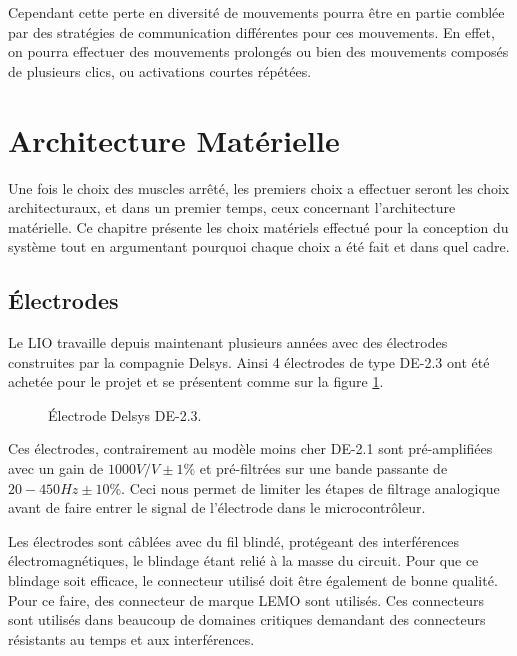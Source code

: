 \documentclass[letterpaper, twoside, 12pt, memoire, creativecommons, hyperref]{thETS}
\begin{document}
Cependant cette perte en diversité de mouvements pourra être en partie comblée par des stratégies de communication différentes pour ces mouvements. En effet, on pourra effectuer des mouvements prolongés ou bien des mouvements composés de plusieurs clics, ou activations courtes répétées. 


\section{Architecture Matérielle}\label{CHarchimat}

Une fois le choix des muscles arrêté, les premiers choix a effectuer seront les choix architecturaux, et dans un premier temps, ceux concernant l'architecture matérielle. Ce chapitre présente les choix matériels effectué pour la conception du système tout en argumentant pourquoi chaque choix a été fait et dans quel cadre.

\subsection{Électrodes}

Le LIO travaille depuis maintenant plusieurs années avec des électrodes construites par la compagnie Delsys. Ainsi 4 électrodes de type DE-2.3 ont été achetée pour le projet et se présentent comme sur la figure \ref{fig:de2.3}. 

\begin{figure}
	\centering
	\caption{Électrode Delsys DE-2.3.}
	\label{fig:de2.3}
\end{figure}

Ces électrodes, contrairement au modèle moins cher DE-2.1 sont pré-amplifiées avec un gain de $1000 V/V \pm 1\%$ et pré-filtrées sur une bande passante de $20-450 Hz \pm 10\%$. Ceci nous permet de limiter les étapes de filtrage analogique avant de faire entrer le signal de l'électrode dans le microcontrôleur. 

Les électrodes sont câblées avec du fil blindé, protégeant des interférences électromagnétiques, le blindage étant relié à la masse du circuit. Pour que ce blindage soit efficace, le connecteur utilisé doit être également de bonne qualité. Pour ce faire, des connecteur de marque LEMO sont utilisés. Ces connecteurs sont utilisés dans beaucoup de domaines critiques demandant des connecteurs résistants au temps et aux interférences. 
\end{document}
